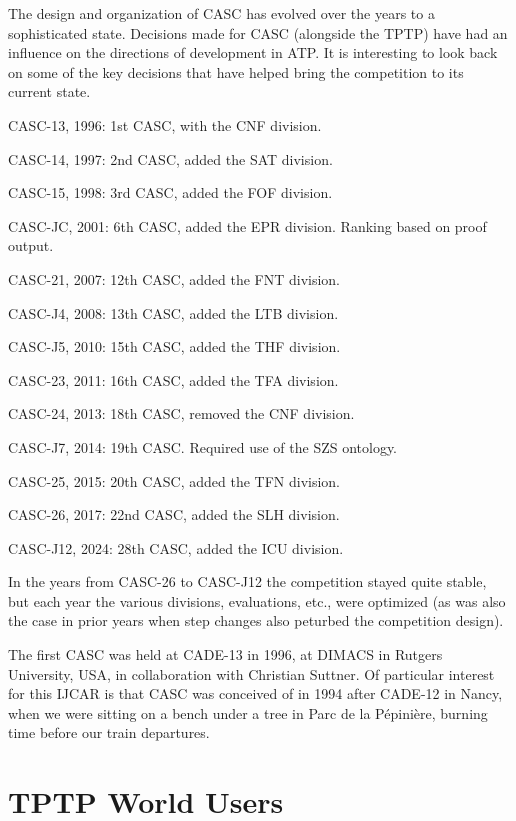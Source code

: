\documentclass{easychair}
\newenvironment{packed_itemize}{
\vspace*{-0.2em}
\begin{itemize}
\setlength{\partopsep}{0pt}
\setlength{\itemsep}{1pt}
\setlength{\parskip}{0pt}
\setlength{\parsep}{0pt}
}{\end{itemize}}
\begin{document}
The design and organization of CASC has evolved over the years to a sophisticated state.
Decisions made for CASC (alongside the TPTP) have had an influence on the directions of 
development in ATP.
It is interesting to look back on some of the key decisions that have helped bring the competition 
to its current state.
\begin{packed_itemize}
\item CASC-13, 1996: 1st CASC, with the CNF division.
\item CASC-14, 1997: 2nd CASC, added the SAT division.
\item CASC-15, 1998: 3rd CASC, added the FOF division.
\item CASC-JC, 2001: 6th CASC, added the EPR division. Ranking based on proof output.
\item CASC-21, 2007: 12th CASC, added the FNT division.
\item CASC-J4, 2008: 13th CASC, added the LTB division.
\item CASC-J5, 2010: 15th CASC, added the THF division.
\item CASC-23, 2011: 16th CASC, added the TFA division.
\item CASC-24, 2013: 18th CASC, removed the CNF division.
\item CASC-J7, 2014: 19th CASC. Required use of the SZS ontology.
\item CASC-25, 2015: 20th CASC, added the TFN division.
\item CASC-26, 2017: 22nd CASC, added the SLH division.
\item CASC-J12, 2024: 28th CASC, added the ICU division.
\end{packed_itemize}
In the years from CASC-26 to CASC-J12 the competition stayed quite stable, but each year
the various divisions, evaluations, etc., were optimized (as was also the case in prior years
when step changes also peturbed the competition design).

The first CASC was held at CADE-13 in 1996, at DIMACS in Rutgers University, USA, in collaboration
with Christian Suttner.
Of particular interest for this IJCAR is that CASC was conceived of in 1994 after CADE-12 in
Nancy, when we were sitting on a bench under a tree in Parc de la Pépinière, burning time before
our train departures.

\section{TPTP World Users}
\label{Users}
\end{document}
